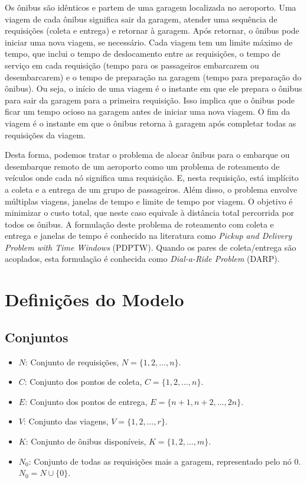 \documentclass[12pt, a4paper]{article}
\begin{document}
Os ônibus são idênticos e partem de uma garagem localizada no aeroporto. Uma viagem de cada ônibus significa sair da garagem, atender uma sequência de requisições (coleta e entrega) e retornar à garagem. Após retornar, o ônibus pode iniciar uma nova viagem, se necessário. Cada viagem tem um limite máximo de tempo, que inclui o tempo de deslocamento entre as requisições, o tempo de serviço em cada requisição (tempo para os passageiros embarcarem ou desembarcarem) e o tempo de preparação na garagem (tempo para preparação do ônibus). Ou seja, o início de uma viagem é o instante em que ele prepara o ônibus para sair da garagem para a primeira requisição. Isso implica que o ônibus pode ficar um tempo ocioso na garagem antes de iniciar uma nova viagem. O fim da viagem é o instante em que o ônibus retorna à garagem após completar todas as requisições da viagem.

Desta forma, podemos tratar o problema de alocar ônibus para o embarque ou desembarque remoto de um aeroporto como um problema de roteamento de veículos onde cada nó significa uma requisição. E, nesta requisição, está implícito a coleta e a entrega de um grupo de passageiros. Além disso, o problema envolve múltiplas viagens, janelas de tempo e limite de tempo por viagem. O objetivo é minimizar o custo total, que neste caso equivale à distância total percorrida por todos os ônibus. A formulação deste problema de roteamento com coleta e entrega e janelas de tempo é conhecido na literatura como \textit{Pickup and Delivery Problem with Time Windows} (PDPTW). Quando os pares de coleta/entrega são acoplados, esta formulação é conhecida como \textit{Dial-a-Ride Problem} (DARP).

\section{Definições do Modelo}

\subsection{Conjuntos}
\begin{itemize}
    \item $N$: Conjunto de requisições, $N = \{1, 2, \dots, n\}$.
    \item $C$: Conjunto dos pontos de coleta, $C = \{1, 2, \dots, n\}$.
    \item $E$: Conjunto dos pontos de entrega, $E = \{n+1, n+2, \dots, 2n\}$.
    \item $V$: Conjunto das viagens, $V = \{1, 2, \dots, r\}$.
    \item $K$: Conjunto de ônibus disponíveis, $K = \{1, 2, \dots, m\}$.
    \item $N_0$: Conjunto de todas as requisições mais a garagem, representado pelo nó $0$. $N_0 = N \cup \{0\}$.
\end{itemize}
\end{document}

